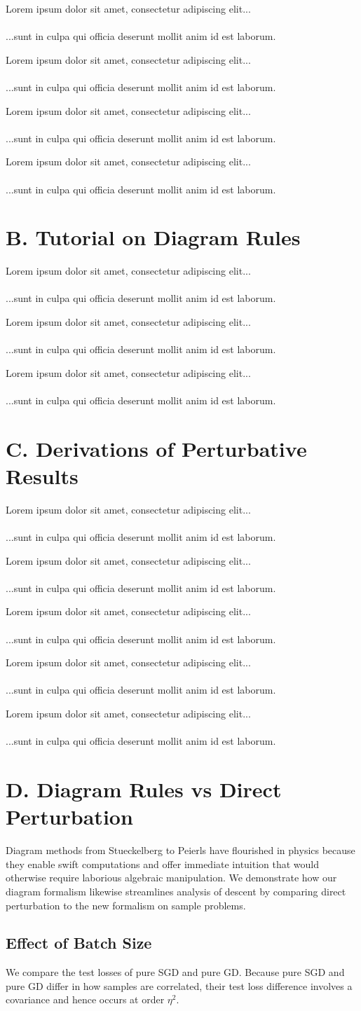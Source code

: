 \documentclass{article}
\newcommand{\lorem}[1]{
    Lorem ipsum dolor sit amet, consectetur adipiscing elit...\\
    \nopagebreak\vspace{#1cm} \ \\
    ...sunt in culpa qui officia deserunt mollit anim id est laborum.
}
\begin{document}
    \lorem{3}
    \lorem{3}
    \lorem{3}
    \lorem{3}

\section*{B. Tutorial on Diagram Rules}
    \lorem{3}
    \lorem{3}
    \lorem{3}

\section*{C. Derivations of Perturbative Results}

    \lorem{3}
    \lorem{3}
    \lorem{3}
    \lorem{3}
    \lorem{3}

\section*{D. Diagram Rules vs Direct Perturbation}
    Diagram methods from Stueckelberg to Peierls have flourished in physics
    because they enable swift computations and offer immediate intuition that
    would otherwise require laborious algebraic manipulation.  We demonstrate
    how our diagram formalism likewise streamlines analysis of descent by
    comparing direct perturbation to the new formalism on sample problems.

    \subsection*{Effect of Batch Size}
        We compare the test losses of pure SGD and pure GD.  Because pure
        SGD and pure GD differ in how samples are correlated, their test loss
        difference involves a covariance and hence occurs at order $\eta^2$.  
\end{document}
